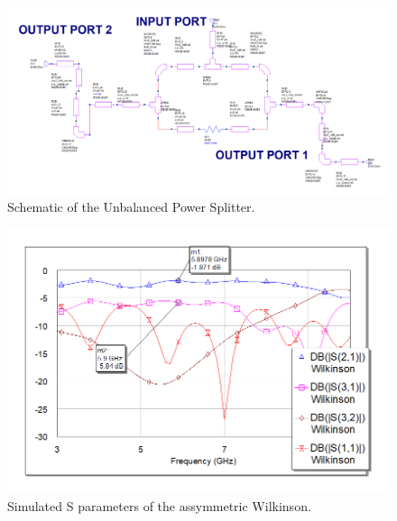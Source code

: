 \documentclass[reprint, aps, prl]{revtex4-1}
\begin{document}
\begin{figure}[!htbp]
    \centering
    \includegraphics[scale=0.35]{Unbalanced_Wilkinson_Schematic.png}
    \caption{Schematic of the Unbalanced Power Splitter.}
    \label{fig:AsWilkSchematic}
\end{figure}

\begin{figure}[!htbp]
    \centering
    \includegraphics[scale=0.35]{Unbalanced_Wilkinson_params.png}
    \caption{Simulated S parameters of the assymmetric Wilkinson.}
    \label{fig:AsWilkParams}
\end{figure}
\end{document}
